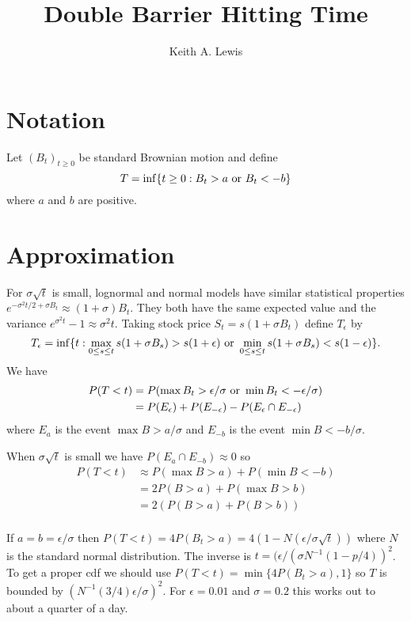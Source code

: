 \documentclass[11pt]{article}
\title{Double Barrier Hitting Time}
\author{Keith A. Lewis}
\begin{document}
\maketitle

\section{Notation}

Let \((B_t)_{t\ge0}\) be standard Brownian motion and define
\[
T = \inf\{t\ge0 : B_t > a\  {\rm or}\  B_t < -b\}
\] where \(a\) and \(b\) are positive. 


\section{Approximation}
For \(\sigma\sqrt{t}\) is small, lognormal and normal models have
similar statistical properties 
\(e^{-\sigma^2t/2 + \sigma B_t}\approx (1 + \sigma)B_t\).
They both have the same expected value and the variance
\(e^{\sigma^2t} - 1 \approx \sigma^2 t\). Taking stock
price \(S_t = s(1 + \sigma B_t)\) define \(T_\epsilon\)
by
\[
T_\epsilon = \inf\{t : 
\max_{0\le s\le t} s(1 + \sigma B_s) > s(1 + \epsilon)\ {\rm or}\ 
\min_{0\le s\le t} s(1 + \sigma B_s) < s(1 - \epsilon)\}.
\]
We have
\begin{align*}
P(T < t) 
&= P(\max B_t > \epsilon/\sigma\ 
{\rm or}\ 
\min B_t < -\epsilon/\sigma)\\
&= P(E_\epsilon) + P(E_{-\epsilon}) - P(E_\epsilon\cap E_{-\epsilon})\\
\end{align*}
where \(E_a\) is the event \(\max B > a/\sigma\) and \(E_{-b}\) is
the event \(\min B < -b/\sigma\).

When \(\sigma\sqrt{t}\) is small we have
\(P(E_a\cap E_{-b}) \approx 0\) so
\begin{align*}
P(T < t) &\approx P(\max B > a) + P(\min B < -b)\\
	&= 2P(B > a) + P(\max B > b)\\
	&= 2(P(B > a) + P(B > b))\\
\end{align*}

If \(a = b = \epsilon/\sigma\) then 
\(P(T < t) = 4P(B_t > a) = 4(1 - N(\epsilon/\sigma\sqrt{t}))\)
where \(N\) is the standard normal distribution. The inverse
is \(t = (\epsilon/(\sigma N^{-1}(1 - p/4))^2\). 
To get a proper cdf  we should use
\(P(T < t) = \min\{4P(B_t > a), 1\}\) so \(T\) is
bounded by \((N^{-1}(3/4)\epsilon/\sigma)^2\). For
\(\epsilon = 0.01\) and \(\sigma = 0.2\) this works out
to about a quarter of a day.
\end{document}
